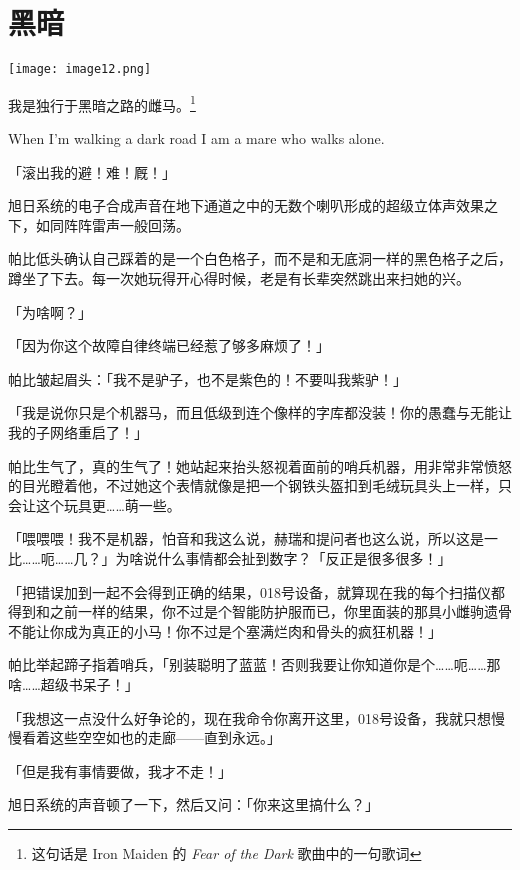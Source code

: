 \chapter{黑暗}

\texttt{[image: image12.png]}

\begin{intro}
我是独行于黑暗之路的雌马。\footnote{这句话是 Iron Maiden 的 \emph{Fear of the Dark} 歌曲中的一句歌词}

When I'm walking a dark road I am a mare who walks alone.
\end{intro}


「滚出我的避！难！厩！」

旭日系统的电子合成声音在地下通道之中的无数个喇叭形成的超级立体声效果之下，如同阵阵雷声一般回荡。

帕比低头确认自己踩着的是一个白色格子，而不是和无底洞一样的黑色格子之后，蹲坐了下去。每一次她玩得开心得时候，老是有长辈突然跳出来扫她的兴。

「为啥啊？」

「因为你这个故障自律终端已经惹了够多麻烦了！」

帕比皱起眉头：「我不是驴子，也不是紫色的！不要叫我紫驴！」

「我是说你只是个机器马，而且低级到连个像样的字库都没装！你的愚蠢与无能让我的子网络重启了！」

帕比生气了，真的生气了！她站起来抬头怒视着面前的哨兵机器，用非常非常愤怒的目光瞪着他，不过她这个表情就像是把一个钢铁头盔扣到毛绒玩具头上一样，只会让这个玩具更……萌一些。

「喂喂喂！我不是机器，怕音和我这么说，赫瑞和提问者也这么说，所以这是一比……呃……几？」为啥说什么事情都会扯到数字？「反正是很多很多！」

「把错误加到一起不会得到正确的结果，018号设备，就算现在我的每个扫描仪都得到和之前一样的结果，你不过是个智能防护服而已，你里面装的那具小雌驹遗骨不能让你成为真正的小马！你不过是个塞满烂肉和骨头的疯狂机器！」

帕比举起蹄子指着哨兵，「别装聪明了蓝蓝！否则我要让你知道你是个……呃……那啥……超级书呆子！」

「我想这一点没什么好争论的，现在我命令你离开这里，018号设备，我就只想慢慢看着这些空空如也的走廊——直到永远。」

「但是我有事情要做，我才不走！」

旭日系统的声音顿了一下，然后又问：「你来这里搞什么？」

